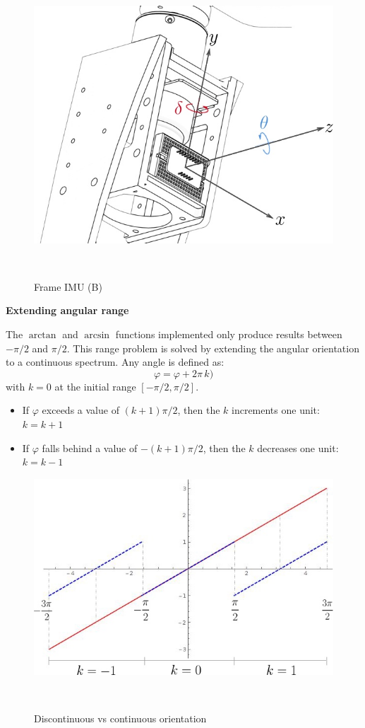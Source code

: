 \begin{figure}[h!]
	\centering
	\includegraphics[width=0.85\linewidth]{figs/05/IMU_B2}
	\caption{Frame IMU (B)}
	\\[-2cm]
\end{figure}

\newpage
\textbf{Extending angular range}

The $\arctan$ and $\arcsin$ functions implemented only produce results between $-\pi/2$ and $\pi/2$. This range problem is solved by extending the angular orientation to a continuous spectrum. Any angle is defined as:
\[\varphi=\varphi+2\pi\,k)\] with $k=0$ at the initial range $[-\pi/2,\pi/2]$.

\begin{itemize}
\begin{itemize}
\item If $\varphi$ exceeds a value of $(k+1)\pi/2$, then the $k$ increments one unit: $k=k+1$
\item If $\varphi$ falls behind a value of $-(k+1)\pi/2$, then the $k$ decreases one unit: $k=k-1$
\end{itemize}
\end{itemize}

\begin{figure}[h!]
	\centering
	\includegraphics[width=0.9\linewidth]{figs/05/Angle_jump}
	\caption{Discontinuous vs continuous orientation}
	\\[-0cm]
\end{figure}

